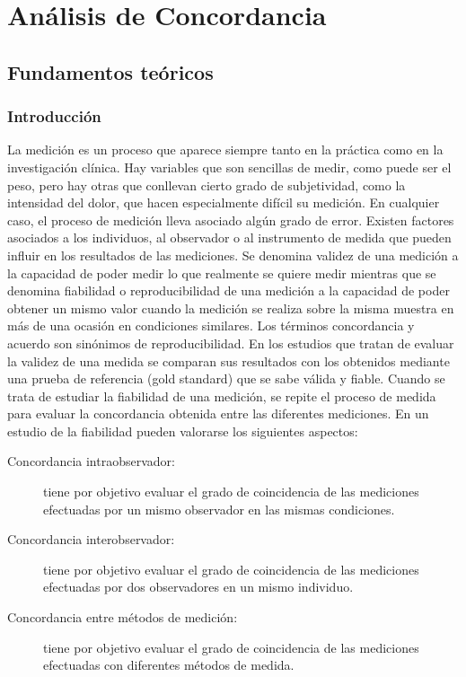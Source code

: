 
\chapter{Análisis de Concordancia}

\section{Fundamentos teóricos}

\subsection{Introducción}

La medición es un proceso que aparece siempre tanto en la práctica como en la investigación clínica. Hay variables que
son sencillas de medir, como puede ser el peso, pero hay otras que conllevan cierto grado de subjetividad, como la
intensidad del dolor, que hacen especialmente difícil su medición. En cualquier caso, el proceso de medición lleva
asociado algún grado de error. Existen factores asociados a los individuos, al observador o al instrumento de medida que
pueden influir en los resultados de las mediciones. Se denomina validez de una medición a la capacidad de poder medir lo
que realmente se quiere medir mientras que se denomina fiabilidad o reproducibilidad de una medición a la capacidad de
poder obtener un mismo valor cuando la medición se realiza sobre la misma muestra en más de una ocasión en condiciones
similares. Los términos concordancia y acuerdo son sinónimos de reproducibilidad. En los estudios que tratan de evaluar
la validez de una medida se comparan sus resultados con los obtenidos mediante una prueba de referencia (gold standard)
que se sabe válida y fiable. Cuando se trata de estudiar la fiabilidad de una medición, se repite el proceso de medida
para evaluar la concordancia obtenida entre las diferentes mediciones. En un estudio de la fiabilidad pueden valorarse
los siguientes aspectos:

\begin{description}
\item[Concordancia intraobservador:] tiene por objetivo evaluar el grado de coincidencia de las mediciones efectuadas
por un mismo observador en las mismas condiciones.
\item[Concordancia interobservador:] tiene por objetivo evaluar el grado de coincidencia de las mediciones efectuadas
por dos observadores en un mismo individuo.
\item[Concordancia entre métodos de medición:] tiene por objetivo evaluar el grado de coincidencia de las mediciones
efectuadas con diferentes métodos de medida.
\end{description}

